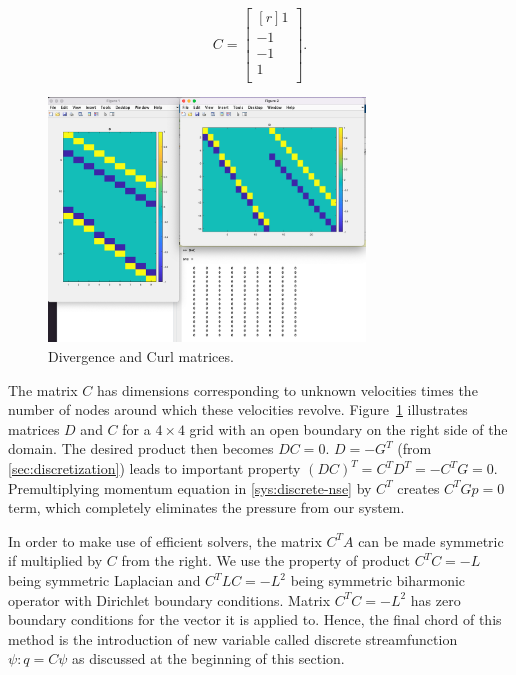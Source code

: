 \documentclass{article}
\numberwithin{equation}{section}
\begin{document}
\begin{equation*}
  C = 
  \begin{bmatrix*}[r]
  1		\\
  -1	\\
  -1	\\
  1		\\
\end{bmatrix*}.
\end{equation*}

\begin{figure}[H]
\begin{center}
  \includegraphics[width=0.75\textwidth]{Figures/D-C-DC}
\end{center}
\caption{Divergence and Curl matrices.}
\label{fig:DC}
\end{figure}
The matrix $C$ has dimensions corresponding to unknown velocities times the number of nodes around which these velocities revolve. 
	Figure~\ref{fig:DC} illustrates matrices $D$ and $C$ for a $4\times4$ grid with an open boundary on the right side of the domain. 
The desired product then becomes $DC=0$. 
	$D=-G^T$ (from \cref{sec:discretization}) leads to important property $(DC)^T=C^TD^T=-C^TG=0$. 
	Premultiplying momentum equation in \cref{sys:discrete-nse} by $C^T$ creates $C^TGp=0$ term, which completely eliminates the pressure from our system.

In order to make use of efficient solvers, the matrix $C^TA$ can be made symmetric if multiplied by $C$ from the right. 
	We use the property of product $C^TC=-L$ being symmetric Laplacian and $C^TLC=-L^2$ being symmetric biharmonic operator with Dirichlet boundary conditions. 
	Matrix $C^TC=-L^2$ has zero boundary conditions for the vector it is applied to.
	Hence, the final chord of this method is the introduction of new variable called discrete streamfunction $\psi:q=C\psi$ as discussed at the beginning of this section.
	
\end{document}
